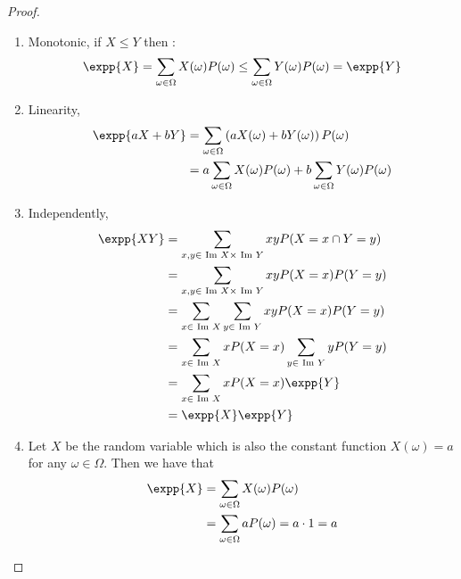 \begin{proof} 
  \begin{enumerate}
\item Monotonic, if $X \le Y$ then : 
  \begin{equation*}
    \begin{split}
      \expp{X} = \sum_{\omega\in \Omega}{X(\omega)P(\omega)} \le  \sum_{\omega\in \Omega}{Y(\omega)P(\omega)} = \expp{Y}
    \end{split}
  \end{equation*}
\item Linearity,
  \begin{equation*}
    \begin{split}    
      \expp{a X + b Y} &=  \sum_{\omega\in \Omega}{ \left( aX(\omega) + bY(\omega) \right) P(\omega)} \\ 
      &=a\sum_{\omega\in \Omega}{  X(\omega)  P(\omega) } + b \sum_{\omega\in \Omega}{   Y(\omega)  P(\omega)}
    \end{split}
  \end{equation*}
\item Independently, 
  \begin{equation*}
    \begin{split}
      \expp{X Y} &= \sum_{x,y \in \image X \times \image Y}{ xy P(X = x \cap Y = y)} \\
      &= \sum_{x,y \in \image X \times \image Y}{ xy P(X = x )P(Y = y)} \\
      &=\sum_{x \in \image X}{\sum_{y \in \image Y}{ xy P(X = x )P(Y = y)}} \\
      &=\sum_{x \in \image X}{xP(X=x)\sum_{y \in \image Y}{ y P(Y = y)}} \\
      &=\sum_{x \in \image X}{xP(X=x) \expp{Y} }  \\ 
      &=\expp{X} \expp{Y}%
    \end{split}
  \end{equation*}
\item Let $X$ be the random variable which is also the constant function $X(\omega) = a$ for any $\omega \in \Omega$. Then we have that
  \begin{equation*}
    \begin{split}
      \expp{X} & = \sum_{\omega\in \Omega}{X(\omega)P(\omega)} \\ & = \sum_{\omega\in \Omega}{a P(\omega)} = a \cdot 1 = a  
    \end{split}
  \end{equation*}
  \end{enumerate}
\end{proof}

